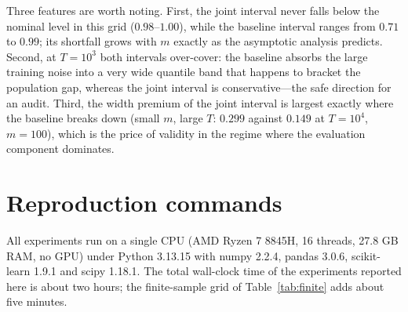 \documentclass[11pt]{article}
\begin{document}
\begin{table}[h]
\centering
\small
\caption{Finite-sample calibration of the three intervals (synthetic DI, protocol A, 100 replications; results/tables/ablation_fs_T*_m*.json).}
\label{tab:finite}
\end{table}

Three features are worth noting.  First, the joint interval never falls below the
nominal level in this grid ($0.98$--$1.00$), while the baseline interval ranges from $0.71$ to
$0.99$; its shortfall grows with $m$ exactly as the asymptotic analysis predicts.  Second, at
$T=10^3$ both intervals over-cover: the baseline absorbs the large training noise into a very wide
quantile band that happens to bracket the population gap, whereas the joint interval is
conservative---the safe direction for an audit.  Third, the width premium of the joint interval is
largest exactly where the baseline breaks down (small $m$, large $T$: $0.299$ against $0.149$ at
$T=10^4$, $m=100$), which is the price of validity in the regime where the evaluation component
dominates.


\section{Reproduction commands}

All experiments run on a single CPU (AMD Ryzen 7 8845H, 16 threads, 27.8 GB RAM,
no GPU) under Python 3.13.15 with numpy 2.2.4, pandas 3.0.6, scikit-learn 1.9.1 and
scipy 1.18.1.  The total wall-clock time of the experiments reported here is about two hours;
the finite-sample grid of Table~\ref{tab:finite} adds about five minutes.
\end{document}
